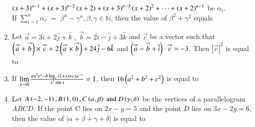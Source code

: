 \documentclass[journal,,12pt,onecolumn]{IEEEtran}
\theoremstyle{remark}
\begin{document}
\begin{enumerate}
    $\left(x+3\right)^{n-1}+\left(x+3\right)^{n-2}\left(x+2\right)+\left(x+3\right)^{n-3}\left(x+2\right)^2+\cdots +\left(x+2\right)^{n-1}$ be $\alpha_i$.\\
    If $\sum_{i=1}^{n} \alpha_r\;=\;{\beta}^n-{\gamma}^n,\beta,\gamma\in \mathbb{N}$, then the value of ${\beta}^2+{\gamma}^2$ equals
    \bigskip
    \item Let $\overset{\rightarrow}{a}=3\hat{i}+2\hat{j}+\hat{k}\;,\;\overset{\rightarrow}{b}=2\hat{i}-\hat{j}+3\hat{k}$ and $\overset{\rightarrow}{c}$ be a vector such that $\left(\overset{\rightarrow}{a}+\overset{\rightarrow}{b}\right)\times \overset{\rightarrow}{c}=2\left(\overset{\rightarrow}{a} \times \overset{\rightarrow}{b}\right)+24\hat{j}-6\hat{k}$ and $\left(\overset{\rightarrow}{a}-\overset{\rightarrow}{b}+\hat{i}\right)\cdot \overset{\rightarrow}{c}=-3$. Then $|\overset{\rightarrow}{c}|^2$ is equal to
    \bigskip
    \item If $\lim \limits_{x\to 0} \frac{ax^2e^x-b\log_{e}{\left(1+x\right)}+cxe^{-x}}{x^2\sin{x}}=1$, then $16\left(a^2+b^2+c^2\right)$ is equal to
    \bigskip
    \item Let $A\left(-2,-1\right),B\left(1,0\right),C\left(\alpha,\beta\right)\text{ and }D\left(\gamma,\delta\right)$ be the vertices of a parallelogram $ABCD$. If the point C lies on $2x-y=5$ and the point $D$ lies on $3x-2y=6$, then the value of $|\alpha + \beta +\gamma +\delta|$ is equal to
\end{enumerate}
\end{document}
